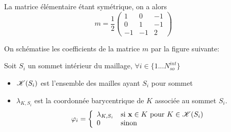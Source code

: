 \documentclass{article}
\begin{document}
La matrice élémentaire étant symétrique, on a alors
\[m=\frac 12\left(\begin{array}{rrr}
1&0&-1\\
0&1&-1\\
-1&-1&2
\end{array}\right)\]

On schématise les coefficients de la matrice $m$ par la figure suivante:

\begin{center}

\end{center}



Soit $S_i$ un sommet intérieur du maillage, $\forall i \in \{1 . . . N_{so}^{int}\}$
\begin{itemize}
\item ${\cal K}(S_i)$ est l'ensemble des mailles ayant $S_i$ pour sommet
\item $\lambda_{K,S_i}$ est la coordonnée barycentrique de $K$ associée au sommet $S_i$.
\[\varphi_i=\left\{\begin{array}{ll}
\lambda_{K,S_i}& \mbox{si }{\bf x}\in K \mbox{ pour } K\in {\cal K}(S_i)\\
0 & \mbox{sinon }
\end{array}\right.
\]
\begin{center}
\end{center}
\end{itemize}
\end{document}
